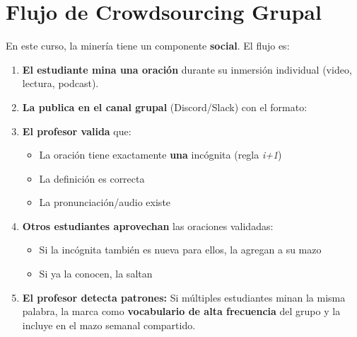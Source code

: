 \documentclass[12pt,a4paper]{article}
\begin{document}
\section{Flujo de Crowdsourcing Grupal}

\begin{cajabueno}
En este curso, la minería tiene un componente \textbf{social}. El flujo es:

\medskip
\begin{enumerate}[leftmargin=1.2cm]
  \item \textbf{El estudiante mina una oración} durante su inmersión individual (video, lectura, podcast).
  
  \item \textbf{La publica en el canal grupal} (Discord/Slack) con el formato:
  \begin{center}
  \end{center}
  
  \item \textbf{El profesor valida} que:
  \begin{itemize}[nosep, leftmargin=0.8cm]
    \item La oración tiene exactamente \textbf{una} incógnita (regla \textit{i+1})
    \item La definición es correcta
    \item La pronunciación/audio existe
  \end{itemize}
  
  \item \textbf{Otros estudiantes aprovechan} las oraciones validadas:
  \begin{itemize}[nosep, leftmargin=0.8cm]
    \item Si la incógnita también es nueva para ellos, la agregan a su mazo
    \item Si ya la conocen, la saltan
  \end{itemize}
  
  \item \textbf{El profesor detecta patrones:} Si múltiples estudiantes minan la misma palabra, la marca como \textbf{vocabulario de alta frecuencia} del grupo y la incluye en el mazo semanal compartido.
\end{enumerate}
\end{cajabueno}
\end{document}
